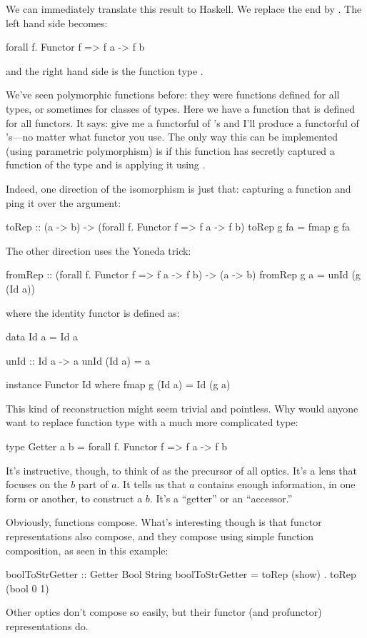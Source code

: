 \documentclass[DaoFP]{subfiles}
\begin{document}
We can immediately translate this result to Haskell. We replace the end by . The left hand side becomes:
\begin{haskell}
forall f. Functor f => f a -> f b
\end{haskell}
and the right hand side is the function type . 

We've seen polymorphic functions before: they were functions defined for all types, or sometimes for classes of types. Here we have a function that is defined for all functors. It says: give me a functorful of 's and I'll produce a functorful of 's---no matter what functor you use. The only way this can be implemented (using parametric polymorphism) is if this function has secretly captured a function of the type  and is applying it using . 

Indeed, one direction of the isomorphism is just that: capturing a function and ping it over the argument:
\begin{haskell}
toRep :: (a -> b) -> (forall f. Functor f => f a -> f b)
toRep g fa = fmap g fa
\end{haskell}
The other direction uses the Yoneda trick:
\begin{haskell}
fromRep :: (forall f. Functor f => f a -> f b) -> (a -> b)
fromRep g a = unId (g (Id a))
\end{haskell}
where the identity functor is defined as:
\begin{haskell}
data Id a = Id a 
  
unId :: Id a -> a
unId (Id a) = a

instance Functor Id where
  fmap g (Id a) = Id (g a)
\end{haskell}

This kind of reconstruction might seem trivial and pointless. Why would anyone want to replace function type  with a much more complicated type:
\begin{haskell}
type Getter a b = forall f. Functor f => f a -> f b
\end{haskell}
It's instructive, though, to think of  as the precursor of all optics. It's a lens that focuses on the $b$ part of $a$. It tells us that $a$ contains enough information, in one form or another, to construct a $b$. It's a ``getter'' or an ``accessor.'' 

Obviously, functions compose. What's interesting though is that functor representations also compose, and they compose using simple function composition, as seen in this example:
\begin{haskell}
boolToStrGetter :: Getter Bool String
boolToStrGetter = toRep (show) . toRep (bool 0 1)
\end{haskell}
Other optics don't compose so easily, but their functor (and profunctor) representations do. 
\end{document}
